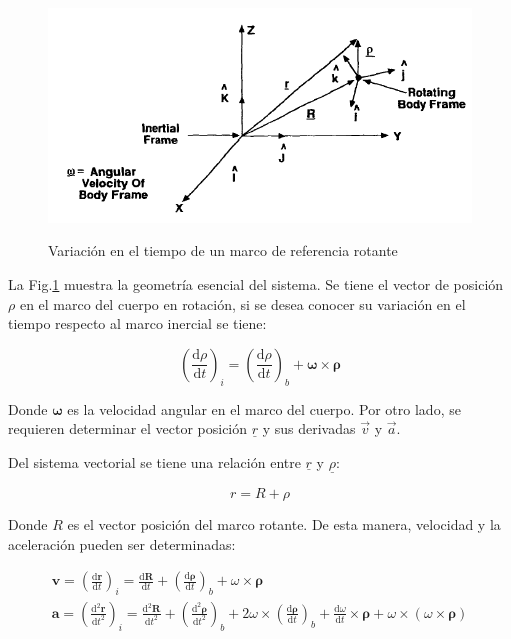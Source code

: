 \begin{figure}[!h]
	\begin{center}
		\includegraphics[scale=0.6]{imagenes/modelo_dinamico/ref_system.PNG}\\
	\end{center}
	\caption{Variación en el tiempo de un marco de referencia rotante}
	\label{fig:rot_frame}
	\textit{}
\end{figure}

La Fig.\ref{fig:rot_frame} muestra la geometría esencial del sistema. Se tiene el vector de posición $\rho$ en el marco del cuerpo en rotación, si se desea conocer su variación en el tiempo respecto al marco inercial se tiene:

\begin{equation}\label{eq:variacion_rho}
	\left(\frac{\mathrm{d} \rho}{\mathrm{d} t}\right)_i=\left(\frac{\mathrm{d} \rho}{\mathrm{d} t}\right)_b+\boldsymbol{\omega} \times \boldsymbol{\rho}
\end{equation}

Donde $\boldsymbol{\omega}$ es la velocidad angular en el marco del cuerpo. Por otro lado, se requieren determinar el vector posición $\underline{r}$ y sus derivadas $\vec{v}$ y $\vec{a}$.

Del sistema vectorial se tiene una relación entre $\underline{r}$ y $\underline{\rho}$:

\begin{equation}\label{eq:suma_vectores}
	r = R + \rho
\end{equation}

Donde $R$ es el vector posición del marco rotante. De esta manera, velocidad y la aceleración pueden ser determinadas: 

\begin{gather}
		\boldsymbol{v}=\left(\frac{\mathrm{d} \boldsymbol{r}}{\mathrm{d} t}\right)_i=\frac{\mathrm{d} \boldsymbol{R}}{\mathrm{d} t}+\left(\frac{\mathrm{d} \boldsymbol{\rho}}{\mathrm{d} t}\right)_b+\omega \times \boldsymbol{\rho}\label{eq:velocidad}\\[10pt]			
		\boldsymbol{a}=\left(\frac{\mathrm{d}^2 \boldsymbol{r}}{\mathrm{d} t^2}\right)_i=\frac{\mathrm{d}^2 \boldsymbol{R}}{\mathrm{d} t^2}+\left(\frac{\mathrm{d}^2 \boldsymbol{\rho}}{\mathrm{d} t^2}\right)_b+2 \omega \times\left(\frac{\mathrm{d} \boldsymbol{\rho}}{\mathrm{d} t}\right)_b+\frac{\mathrm{d} \omega}{\mathrm{d} t} \times \boldsymbol{\rho}+\omega \times(\omega \times \boldsymbol{\rho})\label{eq:aceleracion}				
\end{gather}

